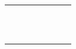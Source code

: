 \documentclass[../alan-handbook.tex]{subfiles}
\begin{document}
\begin{longtable}[c]{|l|l|l|l|l|l|l|}
                        &                       &                               &                   &                      &                           &                            \\ \hline
                        &                       &                               &                   &                      &                           &                            \\ \hline
                        &                       &                               &                   &                      &                           &                            \\ \hline
                        &                       &                               &                   &                      &                           &                            \\ \hline
                        &                       &                               &                   &                      &                           &                            \\ \hline
                        &                       &                               &                   &                      &                           &                            \\ \hline
                        &                       &                               &                   &                      &                           &                            \\ \hline
                        &                       &                               &                   &                      &                           &                            \\ \hline
                        &                       &                               &                   &                      &                           &                            \\ \hline
                        &                       &                               &                   &                      &                           &                            \\ \hline
                        &                       &                               &                   &                      &                           &                            \\ \hline
                        &                       &                               &                   &                      &                           &                            \\ \hline

\end{longtable}
\end{document}
